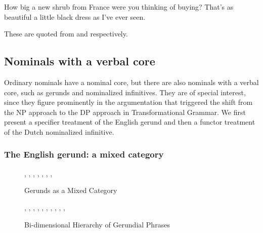 \documentclass[output=paper]{langsci/langscibook}
\begin{document}
\begin{exe} 
\ex\label{shrub} 
\begin{xlist} 
\ex  How big a new shrub from France were you thinking of buying? 
\ex  That's as beautiful a little black dress as I've ever seen.  
\end{xlist} 
\end{exe} 

\noindent
These are quoted from \citet[116]{Zwicky95} and \citet[42]{Troseth09} respectively. 


\subsection{Nominals with a verbal core} 


Ordinary nominals have a nominal core, but there are also nominals  
with a verbal core, such as gerunds and nominalized infinitives. They are 
of special interest, since they figure prominently in the argumentation 
that triggered the shift from the NP approach to the DP approach in Transformational 
Grammar. We first present a specifier treatment of the English gerund and then 
a functor treatment of the Dutch nominalized infinitive. 


\subsubsection{The English gerund: a mixed category} 


\begin{figure}
\begin{center}
\footnotesize
\tree
{,
  {,  
    {},
    {}, 
    {}},
  {,
    {},      
    {}}}
\caption{ \label{ger} Gerunds as a Mixed Category }
\normalsize
\end{center} 
\end{figure}   

\begin{figure}
\begin{center}
\footnotesize
\tree
    {,
      {, 
        {,
          {,
            {}}, 
          {,
            {}}, 
          {}}},
     {, 
        {},
        {}}}
\caption{\label{bido} Bi-dimensional Hierarchy of Gerundial Phrases } 
\normalsize
\end{center}
\end{figure}
\end{document}
